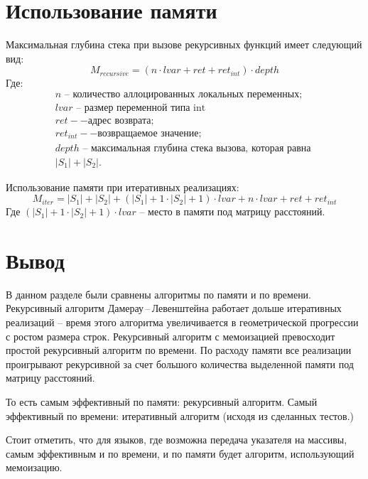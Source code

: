 \section{Использование памяти}

Максимальная глубина стека при вызове рекурсивных функций имеет следующий вид:
\begin{equation}\label{rec-mem}
	M_{recursive} = (n \cdot lvar + ret + ret_{int}) \cdot depth
\end{equation}
Где:
\[
\begin{array}{l}
	n\text{ -- количество аллоцированных локальных переменных}; \\
	lvar\text{ -- размер переменной типа int} \\
	ret -- \text{адрес возврата;}\\
	ret_{int} -- \text{возвращаемое значение;}\\
	depth\text{ --  максимальная глубина стека вызова, которая равна } \\
	|S_1| + |S_2|.
\end{array}
\]

Использование памяти при итеративных реализациях: 
\begin{equation}
	M_{iter} = |S_1| + |S_2| + (|S_1| + 1 \cdot |S_2| + 1) \cdot lvar + n \cdot lvar + ret + ret_{int}
\end{equation}
Где $(|S_1| + 1 \cdot |S_2| + 1) \cdot lvar$ -- место в памяти под матрицу расстояний.

\section{Вывод}
В данном разделе были сравнены алгоритмы по памяти и по времени.
Рекурсивный алгоритм  Дамерау\,--\,Левенштейна работает дольше итеративных реализаций -- время этого алгоритма увеличивается в геометрической прогрессии с ростом размера строк.
Рекурсивный алгоритм с мемоизацией превосходит простой рекурсивный алгоритм по времени. 
По расходу памяти все реализации проигрывают рекурсивной за счет большого количества выделенной памяти под матрицу расстояний. 

То есть самым эффективный по памяти: рекурсивный алгоритм.
Самый эффективный по времени: итеративный алгоритм (исходя из сделанных тестов.)  

Стоит отметить, что для языков, где возможна передача указателя на массивы, самым эффективным и по времени, и по памяти будет алгоритм, использующий мемоизацию.